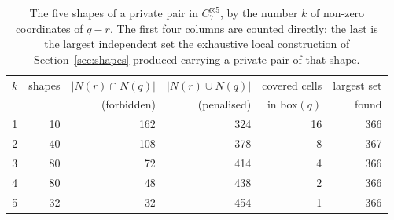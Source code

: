 \begin{table}[t]
\centering\small
\begin{tabular}{@{}crrrrr@{}}
\toprule
$k$ & shapes & $|N(r)\cap N(q)|$ & $|N(r)\cup N(q)|$ & covered cells & largest set \\
 & & (forbidden) & (penalised) & in box$(q)$ & found \\
\midrule
1 & 10 & 162 & 324 & 16 & 366 \\
2 & 40 & 108 & 378 & 8 & 367 \\
3 & 80 & 72 & 414 & 4 & 366 \\
4 & 80 & 48 & 438 & 2 & 366 \\
5 & 32 & 32 & 454 & 1 & 366 \\
\bottomrule
\end{tabular}
\caption{The five shapes of a private pair in $C_7^{\boxtimes 5}$, by the number $k$ of non-zero coordinates of $q-r$. The first four columns are counted directly; the last is the largest independent set the exhaustive local construction of Section~\ref{sec:shapes} produced carrying a private pair of that shape.}
\label{tab:shapes}
\end{table}
